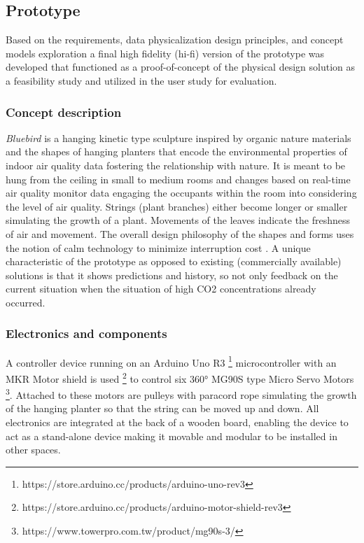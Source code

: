 \subsection{Prototype}
\label{sec:prototype_results}

Based on the requirements, data physicalization design principles, and concept models exploration a final high fidelity (hi-fi) version of the prototype was developed that functioned as a proof-of-concept of the physical design solution as a feasibility study and utilized in the user study for evaluation.

\subsubsection{Concept description}

\textit{Bluebird} is a hanging kinetic type sculpture inspired by organic nature materials and the shapes of hanging planters that encode the environmental properties of indoor air quality data fostering the relationship with nature. It is meant to be hung from the ceiling in small to medium rooms and changes based on real-time air quality monitor data engaging the occupants within the room into considering the level of air quality. Strings (plant branches) either become longer or smaller simulating the growth of a plant. Movements of the leaves indicate the freshness of air and movement. The overall design philosophy of the shapes and forms uses the notion of calm technology to minimize interruption cost \cite{case_calm_2016}. A unique characteristic of the prototype as opposed to existing (commercially available) solutions is that it shows predictions and history, so not only feedback on the current situation when the situation of high CO2 concentrations already occurred.

\subsubsection{Electronics and components}

A controller device running on an Arduino Uno R3 \footnote{https://store.arduino.cc/products/arduino-uno-rev3} microcontroller with an MKR Motor shield is used \footnote{https://store.arduino.cc/products/arduino-motor-shield-rev3} to control six 360° MG90S type Micro Servo Motors \footnote{https://www.towerpro.com.tw/product/mg90s-3/}. Attached to these motors are pulleys with paracord rope simulating the growth of the hanging planter so that the string can be moved up and down. All electronics are integrated at the back of a wooden board, enabling the device to act as a stand-alone device making it movable and modular to be installed in other spaces.


